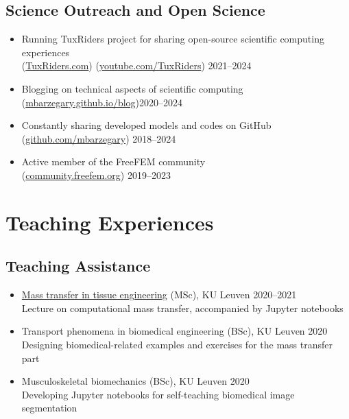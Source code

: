 \documentclass{cv}
\begin{document}
\subsection{Science Outreach and Open Science}

\begin{itemize}[itemsep=-0.2ex]
\item
Running TuxRiders project for sharing open-source scientific computing experiences \\
(\href{http://www.tuxriders.com/}{TuxRiders.com}) (\href{https://www.youtube.com/TuxRiders}{youtube.com/TuxRiders}) \hfill 2021--2024
\item
Blogging on technical aspects of scientific computing \\(\href{https://mbarzegary.github.io/blog}{mbarzegary.github.io/blog})\hfill 2020--2024
\item
Constantly sharing developed models and codes on GitHub \\(\href{https://github.com/mbarzegary}{github.com/mbarzegary}) \hfill 2018--2024
\item
Active member of the FreeFEM community\\(\href{https://community.freefem.org/}{community.freefem.org}) \hfill 2019--2023
\end{itemize}


\section{Teaching Experiences}

\subsection{Teaching Assistance}


\begin{itemize}[itemsep=-0.2ex]
\item 
\href{https://github.com/mbarzegary/mass-transport-tissue-engineering-fall2021}{Mass transfer in tissue engineering} (MSc), KU Leuven \hfill 2020--2021
\\
Lecture on computational mass transfer, accompanied by Jupyter notebooks 
\item 
Transport phenomena in biomedical engineering (BSc), KU Leuven \hfill 2020
\\
Designing biomedical-related examples and exercises for the mass transfer part
\item 
Musculoskeletal biomechanics (BSc), KU Leuven \hfill 2020
\\
Developing Jupyter notebooks for self-teaching biomedical image segmentation 
\end{itemize}
\end{document}
